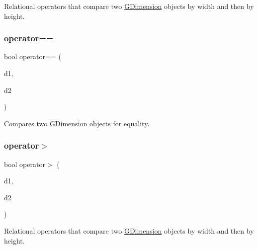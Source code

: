 Relational operators that compare two \mbox{\hyperlink{classGDimension}{G\+Dimension}} objects by width and then by height. 

\mbox{\label{classGDimension_a6bdb9d07a69c8f061d887e6f24750640}} 
\subsubsection{\texorpdfstring{operator==}{operator==}}
{\footnotesize\ttfamily bool operator== (\begin{DoxyParamCaption}\item[{const \mbox{\hyperlink{classGDimension}{G\+Dimension}} \&}]{d1,  }\item[{const \mbox{\hyperlink{classGDimension}{G\+Dimension}} \&}]{d2 }\end{DoxyParamCaption})\hspace{0.3cm}{\ttfamily [friend]}}



Compares two \mbox{\hyperlink{classGDimension}{G\+Dimension}} objects for equality. 

\mbox{\label{classGDimension_a9a2ff65ec3535534d2087f7a29ddf1e8}} 
\subsubsection{\texorpdfstring{operator$>$}{operator>}}
{\footnotesize\ttfamily bool operator$>$ (\begin{DoxyParamCaption}\item[{const \mbox{\hyperlink{classGDimension}{G\+Dimension}} \&}]{d1,  }\item[{const \mbox{\hyperlink{classGDimension}{G\+Dimension}} \&}]{d2 }\end{DoxyParamCaption})\hspace{0.3cm}{\ttfamily [friend]}}



Relational operators that compare two \mbox{\hyperlink{classGDimension}{G\+Dimension}} objects by width and then by height. 

\mbox{\label{classGDimension_a52915605adf1b94cbc876aa6b819b70d}} 
